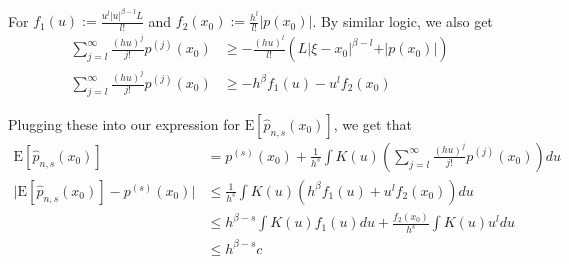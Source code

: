 \documentclass[11pt]{article}
\newcommand{\E}{\mathrm{E}}
\theoremstyle{definition}
\begin{document}
\begin{itemize}
\begin{itemize}
\begin{align*}
                \end{align*}
                For \(f_1(u):=\frac{u^l\vert u \vert^{\beta-l}L}{l!}\) and \(f_2(x_0):=\frac{h^l}{l!}\vert p(x_0)\vert\). By similar logic, we also get
                \begin{align*}
                    \sum_{j=l}^\infty \frac{(hu)^j}{j!}p^{(j)}(x_0) &\geq -\frac{(hu)^l}{l!}(L\vert \xi - x_0\vert^{\beta-l} + \vert p(x_0)\vert) \\
                    \sum_{j=l}^\infty \frac{(hu)^j}{j!}p^{(j)}(x_0) &\geq -h^\beta f_1(u)- u^lf_2(x_0) 
                \end{align*}

                Plugging these into our expression for \(\E[\hat p_{n,s}(x_0)]\), we get that 
                \begin{align*}
                    \E[\hat p_{n,s}(x_0)] &= p^{(s)}(x_0)+ \frac{1}{h^{s}}\int K(u)\left(\sum_{j=l}^\infty \frac{(hu)^j}{j!}p^{(j)}(x_0)\right) du \\
                    \vert \E[\hat p_{n,s}(x_0)]-p^{(s)}(x_0) \vert &\leq \frac{1}{h^{s}}\int K(u) (h^\beta f_1(u)+ u^lf_2(x_0)) du \\
                                                                &\leq h^{\beta-s}\int K(u) f_1(u) du + \frac{f_2(x_0)}{h^{s}}\int K(u) u^l du\\
                                                                &\leq h^{\beta-s}c
                \end{align*}


\end{itemize}
\end{itemize}
\end{document}
